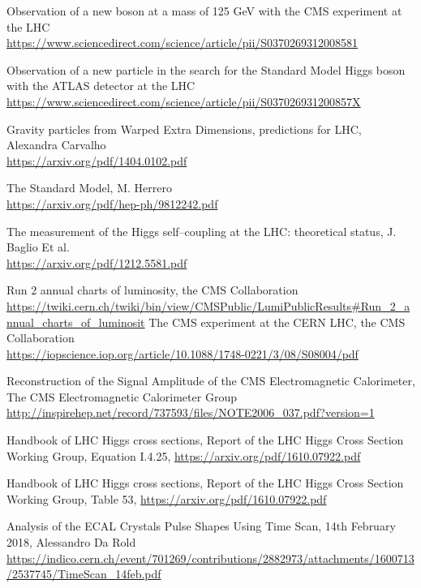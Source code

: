 \begin{thebibliography}{9999}

Observation of a new boson at a mass of 125 GeV with the CMS experiment at the LHC \\
\url{https://www.sciencedirect.com/science/article/pii/S0370269312008581}

Observation of a new particle in the search for the Standard Model Higgs boson with the ATLAS detector at the LHC \\ 
\url{https://www.sciencedirect.com/science/article/pii/S037026931200857X}

Gravity particles from Warped Extra Dimensions,
predictions for LHC, Alexandra Carvalho \\ 
\url{https://arxiv.org/pdf/1404.0102.pdf}

The Standard Model, M. Herrero \\ 
\url{https://arxiv.org/pdf/hep-ph/9812242.pdf}

The measurement of the Higgs self–coupling at the LHC:
theoretical status, J. Baglio Et al. \\ 
\url{https://arxiv.org/pdf/1212.5581.pdf}

Run 2 annual charts of luminosity, the CMS Collaboration \\
\url{https://twiki.cern.ch/twiki/bin/view/CMSPublic/LumiPublicResults#Run_2_annual_charts_of_luminosit}
The CMS experiment at the CERN LHC, the CMS Collaboration \\
\url{https://iopscience.iop.org/article/10.1088/1748-0221/3/08/S08004/pdf}

Reconstruction of the Signal Amplitude of the CMS Electromagnetic Calorimeter, The CMS Electromagnetic Calorimeter Group \\
\url{
http://inspirehep.net/record/737593/files/NOTE2006_037.pdf?version=1
}

Handbook of LHC Higgs cross sections, Report of the LHC Higgs Cross Section Working Group, Equation I.4.25,
\url{https://arxiv.org/pdf/1610.07922.pdf}

Handbook of LHC Higgs cross sections, Report of the LHC Higgs Cross Section Working Group, Table 53,
\url{https://arxiv.org/pdf/1610.07922.pdf}

Analysis of the ECAL Crystals Pulse Shapes Using Time Scan, 14th February 2018, Alessandro Da Rold \\
\url{https://indico.cern.ch/event/701269/contributions/2882973/attachments/1600713/2537745/TimeScan_14feb.pdf}


\end{thebibliography}
